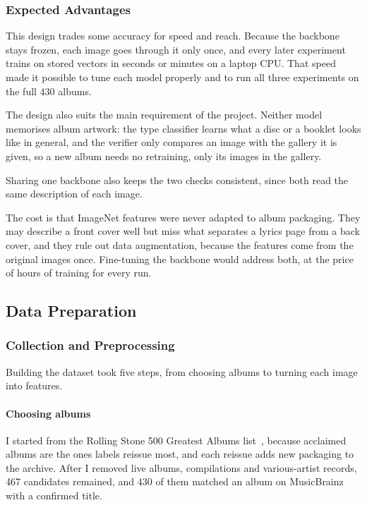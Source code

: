 \documentclass[conference]{IEEEtran}
\begin{document}
\subsubsection{Expected Advantages}\label{sec:advantages}
This design trades some accuracy for speed and reach. Because the backbone stays frozen, each image goes through it only once, and every later experiment trains on stored vectors in seconds or minutes on a laptop CPU. That speed made it possible to tune each model properly and to run all three experiments on the full 430 albums.

The design also suits the main requirement of the project. Neither model memorises album artwork: the type classifier learns what a disc or a booklet looks like in general, and the verifier only compares an image with the gallery it is given, so a new album needs no retraining, only its images in the gallery.

Sharing one backbone also keeps the two checks consistent, since both read the same description of each image.

The cost is that ImageNet features were never adapted to album packaging. They may describe a front cover well but miss what separates a lyrics page from a back cover, and they rule out data augmentation, because the features come from the original images once. Fine-tuning the backbone would address both, at the price of hours of training for every run.

\subsection{Data Preparation}\label{sec:data}

\subsubsection{Collection and Preprocessing}\label{sec:collection}
Building the dataset took five steps, from choosing albums to turning each image into features.

\paragraph{Choosing albums} I started from the Rolling Stone 500 Greatest Albums list~\cite{rollingstone500}, because acclaimed albums are the ones labels reissue most, and each reissue adds new packaging to the archive. After I removed live albums, compilations and various-artist records, 467 candidates remained, and 430 of them matched an album on MusicBrainz with a confirmed title.
\end{document}

